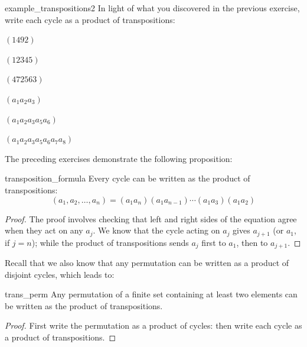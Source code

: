 \begin{exercise}{example_transpositions2}
In light of what you discovered in the previous exercise, write each cycle as a product of transpositions:
\begin{enumerate}[(a)]
\begin{multicols}{3}
\item
$(1 4 9 2)$
\item
$(1 2 3 4 5)$
\item
$(4 7 2 5 6 3)$
\item
$(a_1 a_2 a_3)$
\item
$(a_1 a_2 a_3 a_5 a_6)$
\item
$(a_1 a_2 a_3 a_5 a_6 a_7 a_8)$

\end{multicols}
\end{enumerate}
\end{exercise}

\noindent
The preceding exercises demonstrate the following proposition:

\begin{prop}{transposition_formula}
Every cycle can be written as the product of transpositions:
\[ (a_1, a_2, \ldots, a_n ) = (a_1 a_n ) (a_1 a_{n-1} ) \cdots ( a_1 a_3 ) (a_1 a_2 ) \]
\end{prop}
\begin{proof}
The proof involves checking that left and right sides of the equation agree when they act on any $a_j$. We know that the cycle acting on $a_j$ gives $a_{j+1}$ (or $a_1$, if $j = n$); while the product of transpositions sends $a_j$ first to $a_1$, then to $a_{j+1}$.
\end{proof}

\noindent
Recall that we also know that any permutation can be written as a product of disjoint cycles, which leads to:

\begin{prop}{trans_perm}
Any permutation of a finite set containing at least two elements can
be written as the product of transpositions. 
\end{prop}

\begin{proof} First write the permutation as a product of cycles: then write each cycle as a product of transpositions.
\end{proof}

